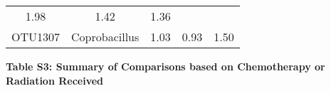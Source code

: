 \documentclass[12pt,]{article}
\begin{document}
\begin{longtable}[]{@{}ccccc@{}}
\begin{minipage}[t]{0.17\columnwidth}
1.98\strut
\end{minipage} & \begin{minipage}[t]{0.25\columnwidth}\centering\strut
1.42\strut
\end{minipage} & \begin{minipage}[t]{0.19\columnwidth}\centering\strut
1.36\strut
\end{minipage}\tabularnewline
\begin{minipage}[t]{0.07\columnwidth}\centering\strut
OTU1307\strut
\end{minipage} & \begin{minipage}[t]{0.18\columnwidth}\centering\strut
Coprobacillus\strut
\end{minipage} & \begin{minipage}[t]{0.17\columnwidth}\centering\strut
1.03\strut
\end{minipage} & \begin{minipage}[t]{0.25\columnwidth}\centering\strut
0.93\strut
\end{minipage} & \begin{minipage}[t]{0.19\columnwidth}\centering\strut
1.50\strut
\end{minipage}\tabularnewline
\bottomrule
\end{longtable}

\normalsize
\newpage

\textbf{Table S3: Summary of Comparisons based on Chemotherapy or
Radiation Received} \footnotesize
\end{document}
